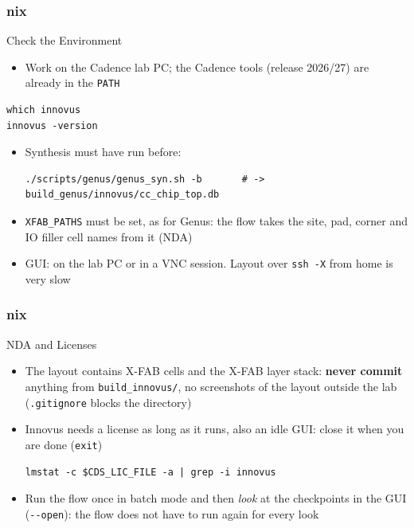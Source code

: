 \documentclass{beamer}
\newcommand{\astitle}{nix}
\newcommand{\assubtitle}{nix}
\newcommand{\cmd}[1]{\texttt{#1}}
\begin{document}
\renewcommand{\assubtitle}{Check the Environment}
\begin{frame}[fragile]
\frametitle{\astitle}
\begin{block}{\assubtitle}
  \begin{itemize}
    \item Work on the Cadence lab PC; the Cadence tools (release 2026/27)
      are already in the \cmd{PATH}
  \end{itemize}
\begin{lstlisting}[style=sh]
which innovus
innovus -version
\end{lstlisting}
  \begin{itemize}
    \item Synthesis must have run before:
\begin{lstlisting}[style=sh]
./scripts/genus/genus_syn.sh -b       # -> build_genus/innovus/cc_chip_top.db
\end{lstlisting}
    \item \cmd{XFAB\_PATHS} must be set, as for Genus: the flow takes the
      site, pad, corner and IO filler cell names from it (NDA)
    \item GUI: on the lab PC or in a VNC session. Layout over \cmd{ssh -X}
      from home is very slow
  \end{itemize}
\end{block}
\end{frame}

\renewcommand{\assubtitle}{NDA and Licenses}
\begin{frame}[fragile]
\frametitle{\astitle}
\begin{block}{\assubtitle}
  \begin{itemize}
    \item The layout contains X-FAB cells and the X-FAB layer stack:
      \textbf{never commit} anything from \cmd{build\_innovus/},
      no screenshots of the layout outside the lab
      (\cmd{.gitignore} blocks the directory)
    \item Innovus needs a license as long as it runs, also an idle GUI:
      close it when you are done (\cmd{exit})
\begin{lstlisting}[style=sh]
lmstat -c $CDS_LIC_FILE -a | grep -i innovus
\end{lstlisting}
    \item Run the flow once in batch mode and then \emph{look} at the
      checkpoints in the GUI (\cmd{-{}-open}): the flow does not have to
      run again for every look
  \end{itemize}
\end{block}
\end{frame}
\end{document}
